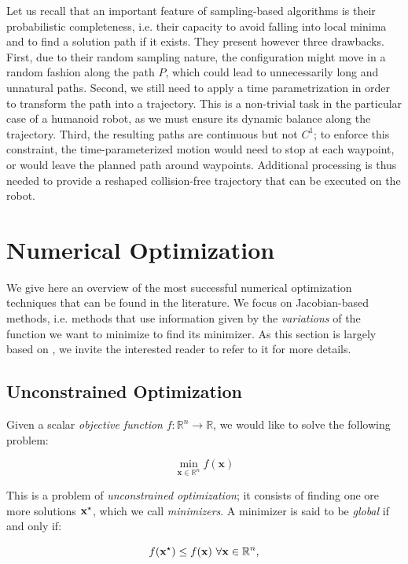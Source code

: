 Let us recall that an important feature of sampling-based algorithms
is their probabilistic completeness, i.e. their capacity to avoid
falling into local minima and to find a solution path if it
exists. They present however three drawbacks. First, due to their
random sampling nature, the configuration \config{} might move in a
random fashion along the path $P$, which could lead to unnecessarily
long and unnatural paths. Second, we still need to apply a time
parametrization in order to transform the path into a trajectory. This
is a non-trivial task in the particular case of a humanoid robot, as
we must ensure its dynamic balance along the trajectory. Third, the
resulting paths are continuous but not $C^1$; to enforce this
constraint, the time-parameterized motion would need to stop at each
waypoint, or would leave the planned path around waypoints. Additional
processing is thus needed to provide a reshaped collision-free
trajectory that can be executed on the robot.

\section{Numerical Optimization}

We give here an overview of the most successful numerical optimization
techniques that can be found in the literature. We focus on
Jacobian-based methods, i.e. methods that use information given by the
\emph{variations} of the function we want to minimize to find its
minimizer. As this section is largely based on
\cite{nocedal1999numerical}, we invite the interested reader to refer
to it for more details.

\subsection{Unconstrained Optimization}

Given a scalar \emph{objective function} $f:\mathbb R^n \rightarrow
\mathbb R$, we would like to solve the following problem:

\begin{equation}
\min_{\mathbf{x}\in\mathbb R^n}f(\mathbf{x})
\end{equation}

This is a problem of \emph{unconstrained optimization}; it consists of
finding one ore more solutions $\mathbf{x}^{\star}$, which we call
\emph{minimizers}. A minimizer is said to be \emph{global} if and only
if:

\begin{equation}
f(\mathbf{x}^{\star}) \le f(\mathbf{x})~\forall \mathbf{x} \in \mathbb R^n,
\end{equation}

